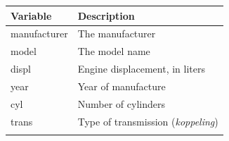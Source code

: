 \documentclass[]{tufte-book}
\begin{document}
\begin{longtable}[]{@{}ll@{}}
\toprule
\begin{minipage}[b]{0.35\columnwidth}\raggedright
Variable\strut
\end{minipage} & \begin{minipage}[b]{0.59\columnwidth}\raggedright
Description\strut
\end{minipage}\tabularnewline
\midrule
\endhead
\begin{minipage}[t]{0.35\columnwidth}\raggedright
manufacturer\strut
\end{minipage} & \begin{minipage}[t]{0.59\columnwidth}\raggedright
The manufacturer\strut
\end{minipage}\tabularnewline
\begin{minipage}[t]{0.35\columnwidth}\raggedright
model\strut
\end{minipage} & \begin{minipage}[t]{0.59\columnwidth}\raggedright
The model name\strut
\end{minipage}\tabularnewline
\begin{minipage}[t]{0.35\columnwidth}\raggedright
displ\strut
\end{minipage} & \begin{minipage}[t]{0.59\columnwidth}\raggedright
Engine displacement, in liters\strut
\end{minipage}\tabularnewline
\begin{minipage}[t]{0.35\columnwidth}\raggedright
year\strut
\end{minipage} & \begin{minipage}[t]{0.59\columnwidth}\raggedright
Year of manufacture\strut
\end{minipage}\tabularnewline
\begin{minipage}[t]{0.35\columnwidth}\raggedright
cyl\strut
\end{minipage} & \begin{minipage}[t]{0.59\columnwidth}\raggedright
Number of cylinders\strut
\end{minipage}\tabularnewline
\begin{minipage}[t]{0.35\columnwidth}\raggedright
trans\strut
\end{minipage} & \begin{minipage}[t]{0.59\columnwidth}\raggedright
Type of transmission (\emph{koppeling})\strut
\end{minipage}\tabularnewline
\begin{minipage}[t]{0.35\columnwidth}\raggedright

\end{minipage}
\end{longtable}
\end{document}
